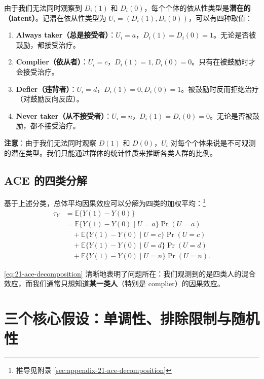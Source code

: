 由于我们无法同时观察到 $D_i(1)$ 和 $D_i(0)$，每个个体的依从性类型是\textbf{潜在的（latent）}。记潜在依从性类型为 $U_i = (D_i(1), D_i(0))$，可以有四种取值：

\begin{enumerate}
  \item \textbf{Always taker（总是接受者）}：$U_i = a$，$D_i(1) = D_i(0) = 1$。无论是否被鼓励，都接受治疗。
  \item \textbf{Complier（依从者）}：$U_i = c$，$D_i(1) = 1, D_i(0) = 0$。只有在被鼓励时才会接受治疗。
  \item \textbf{Defier（违背者）}：$U_i = d$，$D_i(1) = 0, D_i(0) = 1$。被鼓励时反而拒绝治疗（对鼓励反向反应）。
  \item \textbf{Never taker（从不接受者）}：$U_i = n$，$D_i(1) = D_i(0) = 0$。无论是否被鼓励，都不接受治疗。
\end{enumerate}

\textbf{注意}：由于我们无法同时观察 $D(1)$ 和 $D(0)$，$U_i$ 对每个个体来说是不可观测的潜在类型。我们只能通过群体的统计性质来推断各类人群的比例。

\subsection{ACE 的四类分解}

基于上述分类，总体平均因果效应可以分解为四类的加权平均：\footnote{推导见附录 \cref{sec:appendix-21-ace-decomposition}}
\begin{align}
\tau_Y &= \mathbb{E}\{Y(1) - Y(0)\} \label{eq:21-ace-decomposition} \\
&= \mathbb{E}\{Y(1) - Y(0) \mid U = a\} \Pr(U = a) \label{eq:21-term-always} \\
&\quad + \mathbb{E}\{Y(1) - Y(0) \mid U = c\} \Pr(U = c) \label{eq:21-term-complier} \\
&\quad + \mathbb{E}\{Y(1) - Y(0) \mid U = d\} \Pr(U = d) \label{eq:21-term-defier} \\
&\quad + \mathbb{E}\{Y(1) - Y(0) \mid U = n\} \Pr(U = n). \label{eq:21-term-never}
\end{align}

\cref{eq:21-ace-decomposition} 清晰地表明了问题所在：我们观测到的是四类人的混合效应，而我们通常只想知道\textbf{某一类人}（特别是 complier）的因果效应。

\section{三个核心假设：单调性、排除限制与随机性}
\label{sec:21-three-assumptions}

